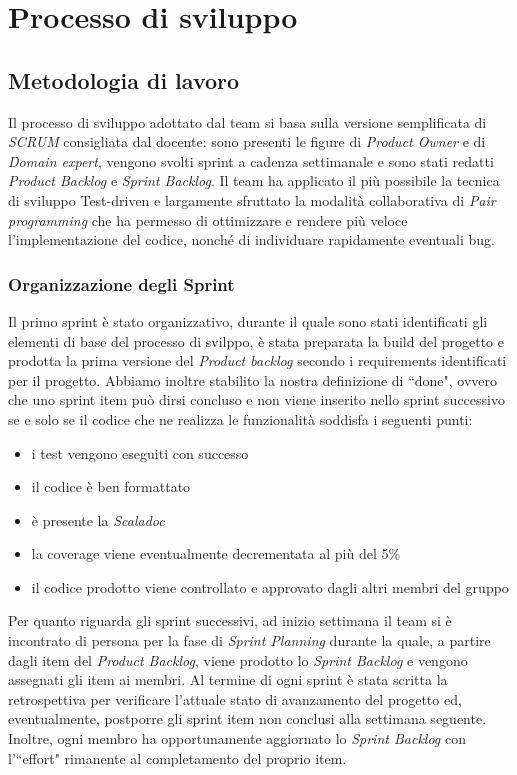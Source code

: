 \chapter{Processo di sviluppo}\label{ch:processo-di-sviluppo}
\section{Metodologia di lavoro}\label{sec:metodologia-di-lavoro}
Il processo di sviluppo adottato dal team si basa sulla versione semplificata di \textit{SCRUM} consigliata dal docente:
sono presenti le figure di \textit{Product Owner} e di \textit{Domain expert}, vengono svolti sprint a cadenza settimanale e sono stati redatti
\textit{Product Backlog} e \textit{Sprint Backlog}.
Il team ha applicato il più possibile la tecnica di sviluppo Test-driven e largamente sfruttato la modalità collaborativa di \textit{Pair programming} che ha
permesso di ottimizzare e rendere più veloce l'implementazione del codice, nonché di individuare rapidamente eventuali bug.

\subsection{Organizzazione degli Sprint}\label{subsec:organizzazione-sprint}
Il primo sprint è stato organizzativo, durante il quale sono stati identificati gli elementi di base del processo di svilppo, è stata preparata la build del progetto e prodotta la prima versione del \textit{Product backlog}
secondo i requirements identificati per il progetto.
Abbiamo inoltre stabilito la nostra definizione di ``done", ovvero che uno sprint item può dirsi concluso e non viene inserito
nello sprint successivo se e solo se il codice che ne realizza le funzionalità soddisfa i seguenti punti:
\begin{itemize}
    \item i test vengono eseguiti con successo
    \item il codice è ben formattato
    \item è presente la \textit{Scaladoc}
    \item la coverage viene eventualmente decrementata al più del 5\%
    \item il codice prodotto viene controllato e approvato dagli altri membri del gruppo
\end{itemize}
Per quanto riguarda gli sprint successivi, ad inizio settimana il team si è incontrato di persona per la fase di \textit{Sprint Planning} durante la quale, a partire dagli item del \textit{Product Backlog}, viene prodotto
lo \textit{Sprint Backlog} e vengono assegnati gli item ai membri.
Al termine di ogni sprint è stata scritta la retrospettiva per verificare l'attuale stato di avanzamento del progetto ed, eventualmente,
postporre gli sprint item non conclusi alla settimana seguente.
Inoltre, ogni membro ha opportunamente aggiornato lo \textit{Sprint Backlog} con l'``effort" rimanente al completamento del proprio item.

